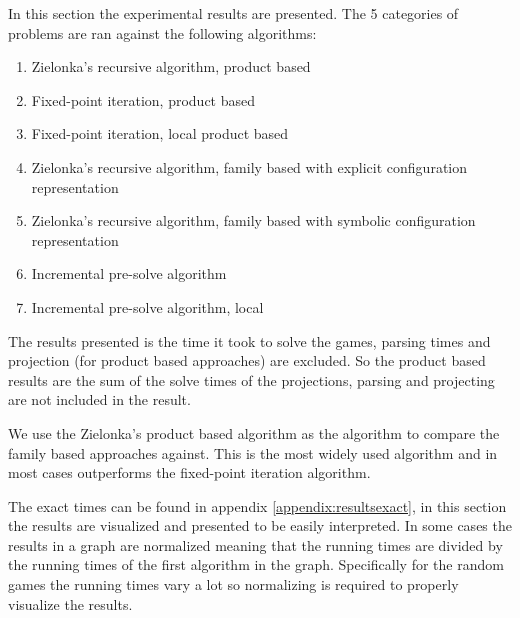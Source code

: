 In this section the experimental results are presented. The 5 categories of problems are ran against the following algorithms:
\begin{enumerate}
	\item Zielonka's recursive algorithm, product based
	\item Fixed-point iteration, product based
	\item Fixed-point iteration, local product based
	\item Zielonka's recursive algorithm, family based with explicit configuration representation
	\item Zielonka's recursive algorithm, family based with symbolic configuration representation
	\item Incremental pre-solve algorithm
	\item Incremental pre-solve algorithm, local
\end{enumerate}

The results presented is the time it took to solve the games, parsing times and projection (for product based approaches) are excluded. So the product based results are the sum of the solve times of the projections, parsing and projecting are not included in the result.

We use the Zielonka's product based algorithm as the algorithm to compare the family based approaches against. This is the most widely used algorithm and in most cases outperforms the fixed-point iteration algorithm.

The exact times can be found in appendix \ref{appendix:resultsexact}, in this section the results are visualized and presented to be easily interpreted. In some cases the results in a graph are normalized meaning that the running times are divided by the running times of the first algorithm in the graph. Specifically for the random games the running times vary a lot so normalizing is required to properly visualize the results.
